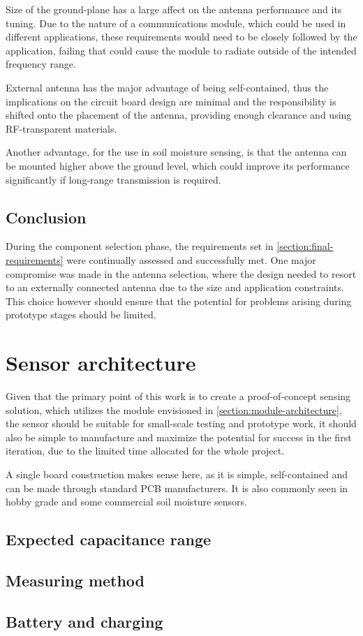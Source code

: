 Size of the ground-plane has a large affect on the antenna performance and its tuning. Due to the nature of a communications module, which could be used in different applications, these requirements would need to be closely followed by the application, failing that could cause the module to radiate outside of the intended frequency range.

External antenna has the major advantage of being self-contained, thus the implications on the circuit board design are minimal and the responsibility is shifted onto the placement of the antenna, providing enough clearance and using RF-transparent materials.

Another advantage, for the use in soil moisture sensing, is that the antenna can be mounted higher above the ground level, which could improve its performance significantly if long-range transmission is required.

\subsection{Conclusion}
During the component selection phase, the requirements set in \ref{section:final-requirements} were continually assessed and successfully met. One major compromise was made in the antenna selection, where the design needed to resort to an externally connected antenna due to the size and application constraints. This choice however should ensure that the potential for problems arising during prototype stages should be limited.

\FloatBarrier
\section{Sensor architecture}
Given that the primary point of this work is to create a proof-of-concept sensing solution, which utilizes the module envisioned in \ref{section:module-architecture}, the sensor should be suitable for small-scale testing and prototype work, it should also be simple to manufacture and maximize the potential for success in the first iteration, due to the limited time allocated for the whole project.

A single board construction makes sense here, as it is simple, self-contained and can be made through standard PCB manufacturers. It is also commonly seen in hobby grade and some commercial soil moisture sensors.

\subsection{Expected capacitance range}

\subsection{Measuring method}

\subsection{Battery and charging}
